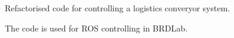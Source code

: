 Refactorised code for controlling a logistics converyor system.

The code is used for ROS controlling in BRDLab. 